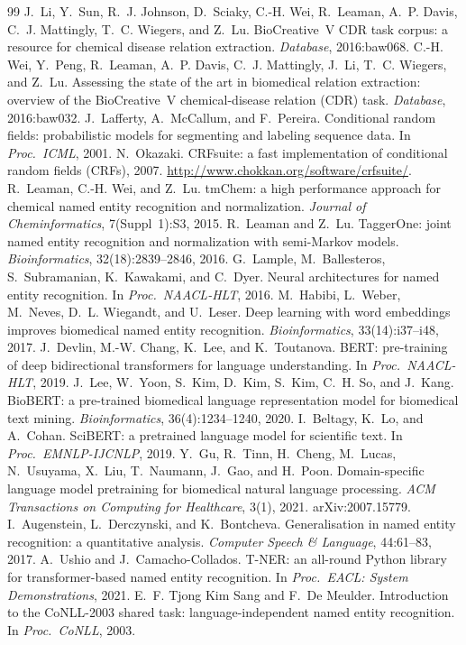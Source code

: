 \documentclass[10pt,a4paper]{article}
\begin{document}
\begin{thebibliography}{99}\small
{} J.~Li, Y.~Sun, R.~J. Johnson, D.~Sciaky, C.-H. Wei, R.~Leaman, A.~P. Davis, C.~J. Mattingly, T.~C. Wiegers, and Z.~Lu.
BioCreative~V CDR task corpus: a resource for chemical disease relation extraction. \emph{Database}, 2016:baw068.
 C.-H. Wei, Y.~Peng, R.~Leaman, A.~P. Davis, C.~J. Mattingly, J.~Li, T.~C. Wiegers, and Z.~Lu.
Assessing the state of the art in biomedical relation extraction: overview of the BioCreative~V chemical-disease relation (CDR) task. \emph{Database}, 2016:baw032.
 J.~Lafferty, A.~McCallum, and F.~Pereira. Conditional random fields: probabilistic models for segmenting and labeling sequence data. In \emph{Proc.\ ICML}, 2001.
 N.~Okazaki. CRFsuite: a fast implementation of conditional random fields (CRFs), 2007. \url{http://www.chokkan.org/software/crfsuite/}.
 R.~Leaman, C.-H. Wei, and Z.~Lu. tmChem: a high performance approach for chemical named entity recognition and normalization. \emph{Journal of Cheminformatics}, 7(Suppl~1):S3, 2015.
 R.~Leaman and Z.~Lu. TaggerOne: joint named entity recognition and normalization with semi-Markov models. \emph{Bioinformatics}, 32(18):2839--2846, 2016.
 G.~Lample, M.~Ballesteros, S.~Subramanian, K.~Kawakami, and C.~Dyer. Neural architectures for named entity recognition. In \emph{Proc.\ NAACL-HLT}, 2016.
 M.~Habibi, L.~Weber, M.~Neves, D.~L. Wiegandt, and U.~Leser. Deep learning with word embeddings improves biomedical named entity recognition. \emph{Bioinformatics}, 33(14):i37--i48, 2017.
 J.~Devlin, M.-W. Chang, K.~Lee, and K.~Toutanova. BERT: pre-training of deep bidirectional transformers for language understanding. In \emph{Proc.\ NAACL-HLT}, 2019.
 J.~Lee, W.~Yoon, S.~Kim, D.~Kim, S.~Kim, C.~H. So, and J.~Kang. BioBERT: a pre-trained biomedical language representation model for biomedical text mining. \emph{Bioinformatics}, 36(4):1234--1240, 2020.
 I.~Beltagy, K.~Lo, and A.~Cohan. SciBERT: a pretrained language model for scientific text. In \emph{Proc.\ EMNLP-IJCNLP}, 2019.
 Y.~Gu, R.~Tinn, H.~Cheng, M.~Lucas, N.~Usuyama, X.~Liu, T.~Naumann, J.~Gao, and H.~Poon. Domain-specific language model pretraining for biomedical natural language processing. \emph{ACM Transactions on Computing for Healthcare}, 3(1), 2021. arXiv:2007.15779.
 I.~Augenstein, L.~Derczynski, and K.~Bontcheva. Generalisation in named entity recognition: a quantitative analysis. \emph{Computer Speech \& Language}, 44:61--83, 2017.
 A.~Ushio and J.~Camacho-Collados. T-NER: an all-round Python library for transformer-based named entity recognition. In \emph{Proc.\ EACL: System Demonstrations}, 2021.
 E.~F. Tjong Kim Sang and F.~De Meulder. Introduction to the CoNLL-2003 shared task: language-independent named entity recognition. In \emph{Proc.\ CoNLL}, 2003.
\end{thebibliography}
\end{document}
